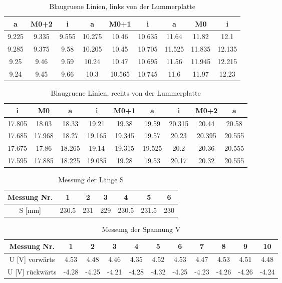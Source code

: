 \documentclass[a4paper,parskip,11pt, DIV12]{scrreprt}
\begin{document}
	\begin{table}[H]	
	\begin{tabular}{|c|c|c||c|c|c||c|c|c|}
	\hline 
a	&	M0+2	&	i	&	a	&	M0+1	&	i	&	a	&	M0	&	i	\\
	\hline
	\hline
9.225	&	9.335	&	9.555	&	10.275	&	10.46	&	10.635	&	11.64	&	11.82	&	12.1	\\
	\hline
9.285	&	9.375	&	9.58	&	10.205	&	10.45	&	10.705	&	11.525	&	11.835	&	12.135	\\
	\hline
9.25	&	9.46	&	9.59	&	10.24	&	10.47	&	10.695	&	11.56	&	11.945	&	12.215	\\
	\hline
9.24	&	9.45	&	9.66	&	10.3	&	10.565	&	10.745	&	11.6	&	11.97	&	12.23	\\
	\hline
	\end{tabular} 
	\caption{Blaugruene Linien, links von der Lummerplatte}
	\end{table}
	
	
	\begin{table}[H]
	\begin{tabular}{|c|c|c||c|c|c||c|c|c|}
	\hline 
i	&	M0	&	a	&	i	&	M0+1	&	a	&	i	&	M0+2	&	a	\\
	\hline
	\hline
17.805	&	18.03	&	18.33	&	19.21	&	19.38	&	19.59	&	20.315	&	20.44	&	20.58	\\
	\hline
17.685	&	17.968	&	18.27	&	19.165	&	19.345	&	19.57	&	20.23	&	20.395	&	20.555	\\
	\hline
17.675	&	17.86	&	18.265	&	19.14	&	19.315	&	19.525	&	20.2	&	20.36	&	20.555	\\
	\hline
17.595	&	17.885	&	18.225	&	19.085	&	19.28	&	19.53	&	20.17	&	20.32	&	20.555	\\
	\hline
	\end{tabular} 
	\caption{Blaugruene Linien, rechts von der Lummerplatte}
	\end{table}
	
	\begin{table}[H]
	\begin{tabular}{|c|c|c|c|c|c|c|}
	\hline 
Messung Nr.	&	1	&	2	&	3	&	4	&	5	&	6	\\
\hline
S [mm]	&	230.5	&	231	&	229	&	230.5	&	231.5	&	230	\\
	\hline
	\end{tabular} 
	\caption{Messung der Länge S}
	\end{table}
	
	\begin{table}[H]
	\begin{tabular}{|c|c|c|c|c|c|c|c|c|c|c|}
	\hline 
Messung Nr.	&	1	&	2	&	3	&	4	&	5	&	6	&	7	&	8	&	9	&	10	\\
\hline
U [V] vorwärts	&	4.53	&	4.48	&	4.46	&	4.35	&	4.52	&	4.53	&	4.47	&	4.53	&	4.51	&	4.48	\\
\hline
U [V] rückwärts	&	-4.28	&	-4.25	&	-4.21	&	-4.28	&	-4.32	&	-4.25	&	-4.23	&	-4.26	&	-4.26	&	-4.24	\\
	\hline
	\end{tabular} 
	\caption{Messung der Spannung V}
	\end{table}
\end{document}

